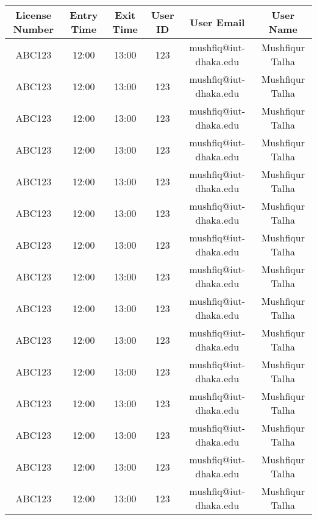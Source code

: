 \documentclass[12pt,notitle]{article}
\begin{document}
\begin{center}
\begin{tabular}{|c|c|c|c|c|c|}
\hline
\end{tabular}
\begin{tabular}{|c|c|c|c|c|c|}
\hline
\textbf{License Number} & \textbf{Entry Time} & \textbf{Exit Time} & \textbf{User ID} & \textbf{User Email} & \textbf{User Name} \\
\hline\hline
ABC123 & 12:00 & 13:00 & 123 & mushfiq@iut-dhaka.edu & Mushfiqur Talha \\
\hline
ABC123 & 12:00 & 13:00 & 123 & mushfiq@iut-dhaka.edu & Mushfiqur Talha \\
\hline
ABC123 & 12:00 & 13:00 & 123 & mushfiq@iut-dhaka.edu & Mushfiqur Talha \\
\hline
ABC123 & 12:00 & 13:00 & 123 & mushfiq@iut-dhaka.edu & Mushfiqur Talha \\
\hline
ABC123 & 12:00 & 13:00 & 123 & mushfiq@iut-dhaka.edu & Mushfiqur Talha \\
\hline
ABC123 & 12:00 & 13:00 & 123 & mushfiq@iut-dhaka.edu & Mushfiqur Talha \\
\hline
ABC123 & 12:00 & 13:00 & 123 & mushfiq@iut-dhaka.edu & Mushfiqur Talha \\
\hline
ABC123 & 12:00 & 13:00 & 123 & mushfiq@iut-dhaka.edu & Mushfiqur Talha \\
\hline
ABC123 & 12:00 & 13:00 & 123 & mushfiq@iut-dhaka.edu & Mushfiqur Talha \\
\hline
ABC123 & 12:00 & 13:00 & 123 & mushfiq@iut-dhaka.edu & Mushfiqur Talha \\
\hline
ABC123 & 12:00 & 13:00 & 123 & mushfiq@iut-dhaka.edu & Mushfiqur Talha \\
\hline
ABC123 & 12:00 & 13:00 & 123 & mushfiq@iut-dhaka.edu & Mushfiqur Talha \\
\hline
ABC123 & 12:00 & 13:00 & 123 & mushfiq@iut-dhaka.edu & Mushfiqur Talha \\
\hline
ABC123 & 12:00 & 13:00 & 123 & mushfiq@iut-dhaka.edu & Mushfiqur Talha \\
\hline
ABC123 & 12:00 & 13:00 & 123 & mushfiq@iut-dhaka.edu & Mushfiqur Talha \\
\hline
\end{tabular}
\end{center}
\end{document}
